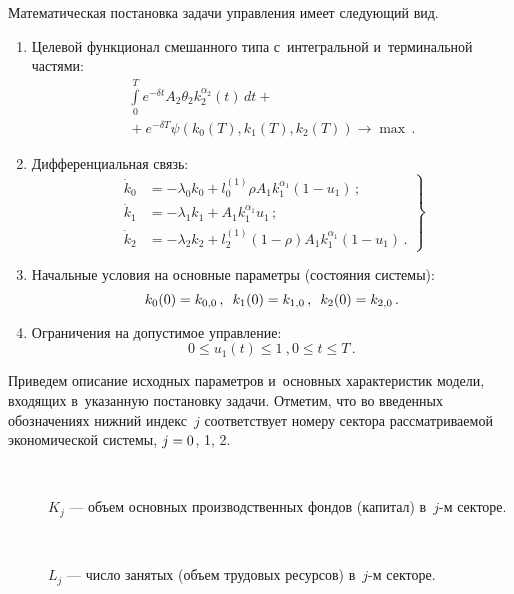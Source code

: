 \begin{multicols}{2}
Математическая постановка задачи управ\-ле\-ния имеет следующий вид.
\begin{enumerate}[1.]
\item  Целевой функционал смешанного типа с~интегральной и~терминальной
частями:
\begin{multline}
\int\limits^T_0 e^{-\delta t}A_2\theta_2k^{\alpha_2}_2(t)\,dt +{}\\
{}+
e^{-\delta T}\psi(k_0(T),k_1(T),k_2(T))\longrightarrow \max\,.
\label{e1-gor}
\end{multline}



\item  Дифференциальная связь:
\begin{equation}
\left.
\begin{array}{rl}
\dot k_0&=-\lambda_0k_0+l^{(1)}_0\rho A_1k^{\alpha_1}_1(1-u_1)\,;
\\[6pt]
\dot k_1&=-\lambda_1k_1+A_1k^{\alpha_1}_1 u_1\,;
\\[6pt]
\dot k_2&=-\lambda_2k_2+l^{(1)}_2(1-\rho)A_1k^{\alpha_1}_1(1-u_1)\,.
\end{array}
\right\}
\label{e2-gor}
\end{equation}


\item Начальные условия на основные параметры (состояния системы):
\begin{equation}
 k_0(0)=k_{0,0}\,,\enskip k_1(0)=k_{1,0}\,,\enskip
k_2(0)=k_{2,0}\,.
\label{e3-gor}
\end{equation}


\item Ограничения на допустимое управление:
\begin{equation}
 0 \leq u_1(t)\leq 1\ , 0 \leq t \leq T\,.
 \label{e4-gor}
 \end{equation}
\end{enumerate}

Приведем описание исходных параметров и~основных характеристик модели, 
входящих в~указанную постановку задачи. Отметим, что во введенных обозначениях 
нижний индекс~$j$ соответствует номеру сектора рассматриваемой экономической системы, 
$j\hm=0$, 1, 2.
\begin{description}
\item[\,] $K_j$ --- объем основных производственных фондов (капитал) в~$j$-м секторе.

\item[\,] $L_j$ --- число занятых (объем трудовых ресурсов) в~$j$-м секторе.


\end{description}
\end{multicols}
